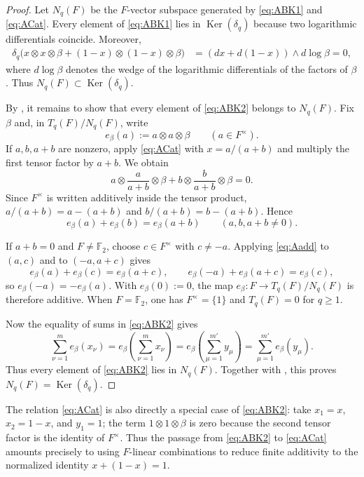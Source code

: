 \documentclass[a4paper,12pt,reqno]{amsart}
\numberwithin{equation}{section}
\theoremstyle{definition}
\DeclareMathOperator{\Ker}{Ker}
\begin{document}
\begin{proof}
Let $N_q(F)$ be the $F$-vector subspace generated by \eqref{eq:ABK1} and
\eqref{eq:ACat}.  Every element of \eqref{eq:ABK1} lies in
$\Ker(\delta_q)$ because two logarithmic differentials coincide.  Moreover,
\begin{align*}
 \delta_q\bigl(x\otimes x\otimes\beta
 +(1-x)\otimes(1-x)\otimes\beta\bigr)
 &=(dx+d(1-x))\wedge d\log\beta=0,
\end{align*}
where $d\log\beta$ denotes the wedge of the logarithmic differentials of
the factors of $\beta$.  Thus $N_q(F)\subset\Ker(\delta_q)$.

By \cite[Lemma~4.2]{BK86}, it remains to show that every element of
\eqref{eq:ABK2} belongs to $N_q(F)$.  Fix $\beta$ and, in
$T_q(F)/N_q(F)$, write
\begin{equation}\label{eq:Ae}
 e_\beta(a):=a\otimes a\otimes\beta
 \qquad(a\in F^\times).
\end{equation}
If $a,b,a+b$ are nonzero, apply \eqref{eq:ACat} with
$x=a/(a+b)$ and multiply the first tensor factor by $a+b$.  We obtain
\[
 a\otimes\frac{a}{a+b}\otimes\beta
 +b\otimes\frac{b}{a+b}\otimes\beta=0.
\]
Since $F^\times$ is written additively inside the tensor product,
$a/(a+b)=a-(a+b)$ and $b/(a+b)=b-(a+b)$.  Hence
\begin{equation}\label{eq:Aadd}
 e_\beta(a)+e_\beta(b)=e_\beta(a+b)
 \qquad(a,b,a+b\neq0).
\end{equation}

If $a+b=0$ and $F\neq\mathbb F_2$, choose
$c\in F^\times$ with $c\neq-a$.  Applying \eqref{eq:Aadd} to $(a,c)$
and to $(-a,a+c)$ gives
\[
 e_\beta(a)+e_\beta(c)=e_\beta(a+c),
 \qquad
 e_\beta(-a)+e_\beta(a+c)=e_\beta(c),
\]
so $e_\beta(-a)=-e_\beta(a)$.  With $e_\beta(0):=0$, the map
$e_\beta:F\to T_q(F)/N_q(F)$ is therefore additive.  When
$F=\mathbb F_2$, one has $F^\times=\{1\}$ and $T_q(F)=0$ for $q\geq1$.

Now the equality of sums in \eqref{eq:ABK2} gives
\[
 \sum_{\nu=1}^{m}e_\beta(x_\nu)
 =e_\beta\left(\sum_{\nu=1}^{m}x_\nu\right)
 =e_\beta\left(\sum_{\mu=1}^{m'}y_\mu\right)
 =\sum_{\mu=1}^{m'}e_\beta(y_\mu).
\]
Thus every element of \eqref{eq:ABK2} lies in $N_q(F)$.  Together with
\cite[Lemma~4.2]{BK86}, this proves $N_q(F)=\Ker(\delta_q)$.
\end{proof}

The relation \eqref{eq:ACat} is also directly a special case of
\eqref{eq:ABK2}: take $x_1=x$, $x_2=1-x$, and $y_1=1$; the term
$1\otimes1\otimes\beta$ is zero because the second tensor factor is the
identity of $F^\times$.  Thus the passage from \eqref{eq:ABK2} to
\eqref{eq:ACat} amounts precisely to using $F$-linear combinations to
reduce finite additivity to the normalized identity $x+(1-x)=1$.
\end{document}
